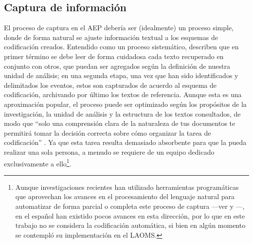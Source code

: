 \documentclass[letterpaper, 11pt]{book}
\theoremstyle{definition}
\theoremstyle{remark}
\begin{document}
\subsection{Captura de información}
\label{sec:AEP_captura}

El proceso de captura en el AEP debería ser (idealmente) un proceso simple, donde de forma natural se ajuste información textual a los esquemas de codificación creados. 
Entendido como un proceso sistemático, \citet{2002_Koopmans_AEP} describen que en primer término se debe leer de forma cuidadosa cada texto recuperado en conjunto con  otros, que puedan ser agregados según la definición de nuestra unidad de análisis; en una segunda etapa, una vez que han sido identificados y delimitados los eventos, estos son capturados de acuerdo al esquema de codificación, archivando por último los textos de referencia. 
Aunque esta es una aproximación popular, el proceso puede ser optimizado según los propósitos de la investigación, la unidad de análisis y la estructura de los textos consultados, de modo que ``solo una comprensión clara de la naturaleza de tus documentos te permitirá tomar la decisión correcta sobre cómo organizar la tarea de codificación'' \normalsize \citep[99]{2010_Franzosi_QNA}. 
Ya que esta tarea resulta demasiado absorbente para que la pueda realizar una sola persona, a menudo se requiere de un equipo dedicado exclusivamente a ello\footnote{Aunque investigaciones recientes han utilizado herramientas programáticas que aprovechan los avances en el procesamiento del lenguaje natural para automatizar de forma parcial o completa este proceso de captura ---ver \citet{2013_Schrodt_automatedPolitical} y \citet{2015_Danilova_Linguistic}---, en el español han existido pocos avances en esta dirección, por lo que en este trabajo no se considera la codificación automática, si bien en algún momento se contempló su implementación en el LAOMS.}.
\end{document}
